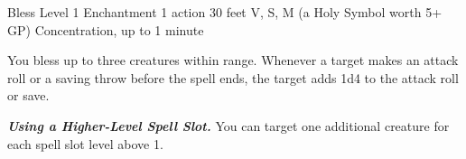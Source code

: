 \DndSpellHeader%
    {Bless}
    {Level 1 Enchantment}
    {1 action}
    {30 feet}
    {V, S, M (a Holy Symbol worth 5+ GP)}
    {Concentration, up to 1 minute}

You bless up to three creatures within range. Whenever a target makes an attack roll or a saving throw before the spell ends, the target adds 1d4 to the attack roll or save.

\textbf{\textit{Using a Higher-Level Spell Slot.}} You can target one additional creature for each spell slot level above 1.
